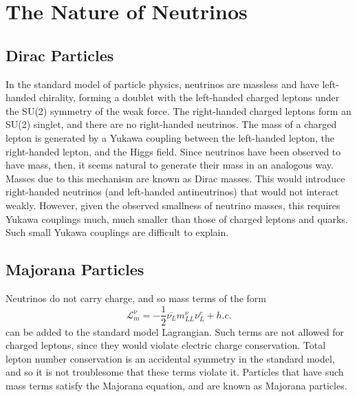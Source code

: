 \documentclass[herrin-thesis.tex]{subfiles}
\begin{document}
\section{The Nature of Neutrinos}
\subsection{Dirac Particles}
In the standard model of particle physics, neutrinos are massless and have left-handed chirality, forming a doublet with the left-handed charged leptons under the SU(2) symmetry of the weak force. The right-handed charged leptons form an SU(2) singlet, and there are no right-handed neutrinos. The mass of a charged lepton is generated by a Yukawa coupling between the left-handed lepton, the right-handed lepton, and the Higgs field. Since neutrinos have been observed to have mass, then, it seems natural to generate their mass in an analogous way. Masses due to this mechanism are known as Dirac masses. This would introduce right-handed neutrinos (and left-handed antineutrinos) that would not interact weakly. However, given the observed smallness of neutrino masses, this requires Yukawa couplings much, much smaller than those of charged leptons and quarks. Such small Yukawa couplings are difficult to explain.

\subsection{Majorana Particles}
Neutrinos do not carry charge, and so mass terms of the form
\begin{equation}
\mathcal{L}_{m}^{\nu} = -\frac{1}{2}\overline{\nu_{L}} m_{L L}^{\nu} \nu_{L}^{c} +h.c.
\label{eq:nu_majorana_lagrangian}
\end{equation}
can be added to the standard model Lagrangian. Such terms are not allowed for charged leptons, since they would violate electric charge conservation. Total lepton number conservation is an accidental symmetry in the standard model, and so it is not troublesome that these terms violate it. Particles that have such mass terms satisfy the Majorana equation, and are known as Majorana particles.
\end{document}
